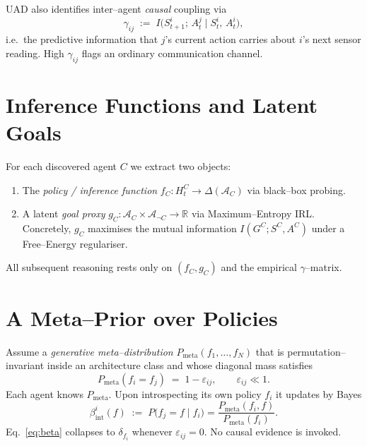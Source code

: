 \documentclass[11pt]{article}
\begin{document}
UAD also identifies inter--agent \emph{causal} coupling via
\begin{equation}\label{eq:gamma}
\gamma_{ij} \;:=\; I\bigl(S^i_{t+1};\,A^j_t\mid S^i_t,\,A^i_t\bigr),
\end{equation}
i.e.~the predictive information that $j$’s current action carries about $i$’s
next sensor reading.  High $\gamma_{ij}$ flags an ordinary communication
channel.

\section{Inference Functions and Latent Goals}
For each discovered agent $C$ we extract two objects:
\begin{enumerate}
  \item The \emph{policy / inference function}
        $f_C\colon H^C_t\to\Delta(\mathcal A_C)$ via black--box probing.
  \item A latent \emph{goal proxy} $g_C\colon \mathcal A_C\times\mathcal A_{\neg C}
        \to\mathbb R$ via Maximum--Entropy IRL\cite{irl2000}.  Concretely, $g_C$
        maximises the mutual information $I(G^C;S^C,A^C)$ under a Free–Energy
        regulariser\cite{friston2010}.
\end{enumerate}
All subsequent reasoning rests only on $(f_C,g_C)$ and the empirical
$\gamma$--matrix.

\section{A Meta--Prior over Policies}
Assume a \emph{generative meta--distribution}
$P_{\text{meta}}(f_1,\dots,f_N)$ that is permutation--invariant inside an
architecture class and whose diagonal mass satisfies
\begin{equation}\label{eq:alpha}
P_{\text{meta}}(f_i=f_j)\;=\;1-\varepsilon_{ij}, \qquad \varepsilon_{ij}\ll1.
\end{equation}
Each agent knows $P_{\text{meta}}$.  Upon introspecting its own policy $f_i$ it
updates by Bayes
\begin{equation}\label{eq:beta}
\beta^{i}_{\text{int}}(f)\;:=\;P\bigl(f_j=f\mid f_i\bigr)=\frac{P_{\text{meta}}(f_i,f)}{P_{\text{meta}}(f_i)}.
\end{equation}
Eq.~\eqref{eq:beta} collapses to $\delta_{f_i}$ whenever $\varepsilon_{ij}=0$.
No causal evidence is invoked.
\end{document}
